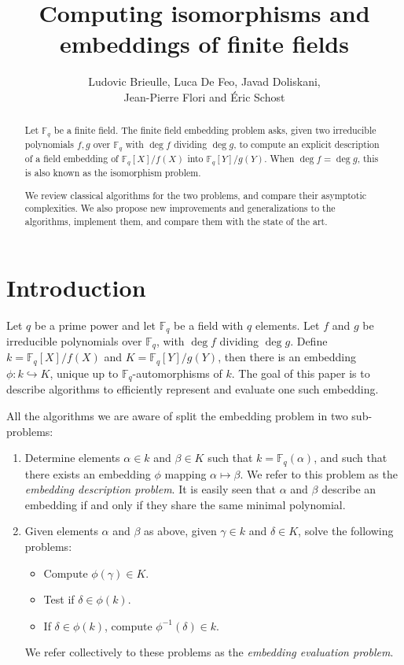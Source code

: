 \documentclass[12pt]{article}
\title{Computing isomorphisms and embeddings of finite fields}
\author{Ludovic Brieulle, Luca De Feo, Javad Doliskani,\\ Jean-Pierre
  Flori and \'Eric Schost}
\theoremstyle{plain}
\theoremstyle{definition}
\def\F{\ensuremath{\mathbb{F}}}
\newcounter{algorithm}
\begin{document}
\maketitle
\begin{abstract}
  Let $\F_q$ be a finite field.  The finite field embedding problem
  asks, given two irreducible polynomials $f,g$ over $\F_q$ with $\deg
  f$ dividing $\deg g$, to compute an explicit description of a field
  embedding of $\F_q[X]/f(X)$ into $\F_q[Y]/g(Y)$. When $\deg f = \deg
  g$, this is also known as the isomorphism problem.
  
  We review classical algorithms for the two problems, and compare
  their asymptotic complexities. We also propose new improvements and
  generalizations to the algorithms, implement them, and compare them
  with the state of the art.
\end{abstract}

\setcounter{tocdepth}{2}
\tableofcontents



\section{Introduction}
\label{sec:introduction}

Let $q$ be a prime power and let $\F_q$ be a field with $q$
elements. Let $f$ and $g$ be irreducible polynomials over $\F_q$, with
$\deg f$ dividing $\deg g$. Define $k=\F_q[X]/f(X)$ and
$K=\F_q[Y]/g(Y)$, then there is an embedding $\phi:k\hookrightarrow
K$, unique up to $\F_q$-automorphisms of $k$. The goal of this paper
is to describe algorithms to efficiently represent and evaluate one
such embedding.

All the algorithms we are aware of split the embedding problem in two
sub-problems:
\begin{enumerate}
\item Determine elements $\alpha\in k$ and $\beta\in K$ such that
  $k=\F_q(\alpha)$, and such that there exists an
  embedding $\phi$ mapping $\alpha\mapsto\beta$. We refer to this
  problem as the \emph{embedding description problem}.
  It is easily seen that $\alpha$ and $\beta$ describe an embedding
  if and only if they share the same minimal polynomial.
\item Given elements $\alpha$ and $\beta$ as above, given $\gamma\in
  k$ and $\delta\in K$, solve the following problems:
  \begin{itemize}
  \item Compute $\phi(\gamma)\in K$.
  \item Test if $\delta\in\phi(k)$.
  \item If $\delta\in\phi(k)$, compute $\phi^{-1}(\delta)\in k$.
  \end{itemize}
  We refer collectively to these problems as the \emph{embedding
    evaluation problem}.
\end{enumerate}
\end{document}
